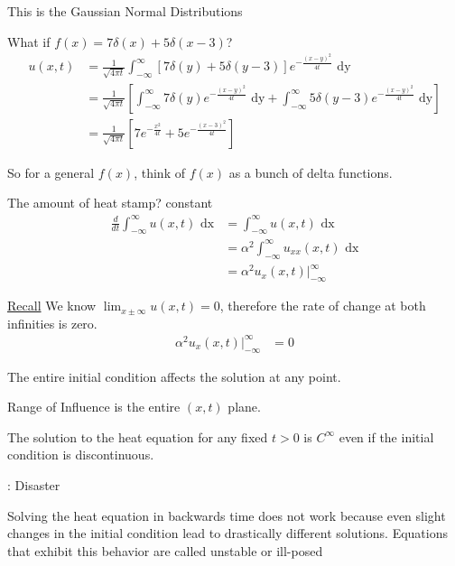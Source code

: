 This is the Gaussian Normal Distributions

What if $f(x) = 7 \delta(x) + 5 \delta(x - 3)$?
%
\begin{align}
  u(x, t) & = \frac{1}{\sqrt{4 \pi t}} \int^\infty_{-\infty} [7 \delta(y) + 5 \delta(y - 3)] e^{-\frac{(x - y)^2}{4 t}} \text{ dy}\\
  & = \frac{1}{\sqrt{4 \pi t}}
  \left[
    \int^\infty_{-\infty} 7 \delta(y) e^{- \frac{(x - y)^2}{4 t}} \text{ dy} +
    \int^\infty_{-\infty} 5 \delta(y - 3) e^{-\frac{(x - y)^2}{4t}} \text{ dy}
  \right]\\
  & = \frac{1}{\sqrt{4 \pi t}}
  \left[
    7e^{- \frac{x^2}{4 t}} + 5 e^{-\frac{(x - 3)^2}{4 t}}
  \right]
\end{align}

So for a general $f(x)$, think of $f(x)$ as a bunch of delta functions.



The amount of heat stamp? constant
%
\begin{align}
  \frac{d}{dt} \int^\infty_{-\infty} u(x, t) \text{ dx}
  & = \int^\infty_{-\infty} u(x, t) \text{ dx}\\
  & = \alpha^2 \int^\infty_{-\infty} u_{xx} (x, t) \text{ dx}\\
  & = \alpha^2 u_x(x, t) \Big|^\infty_{-\infty}
\end{align}

\underline{Recall} We know $\lim_{x \pm \infty} u(x, t) = 0$, therefore the rate of change at both infinities is zero.
%
\begin{align}
  \alpha^2 u_x(x, t) \Big|^\infty_{-\infty} & = 0
\end{align}

\bigbreak


The entire initial condition affects the solution at any point.

Range of Influence is the entire $(x, t)$ plane.

The solution to the heat equation for any fixed $t > 0$ is $C^\infty$ even if the initial condition is discontinuous.

\bigbreak

 : Disaster

Solving the heat equation in backwards time does not work because even slight changes in the initial condition lead to drastically different solutions. Equations that exhibit this behavior are called unstable or ill-posed

